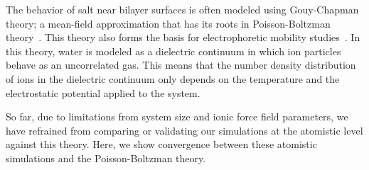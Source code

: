 \documentclass[12pt,openany,final]{book}
\begin{document}
The behavior of salt near bilayer surfaces is often modeled using Gouy-Chapman theory; 
a mean-field approximation that has its roots in Poisson-Boltzman theory~\cite{israelachvili:2011:intermol,wiersema:1966}. 
This theory also forms the basis for electrophoretic mobility studies~\cite{wiersema:1966,o:1978:electrophoretic}. 
In this theory, water is modeled as 
a dielectric continuum in which ion particles behave as an uncorrelated gas. This means that the number density distribution of ions in the dielectric continuum only
depends on the temperature and the electrostatic potential applied to the system.

So far, due to limitations from system size and ionic force field parameters, 
we have refrained from comparing or validating our simulations at the atomistic level against this theory. 
Here, we show convergence between these atomistic simulations and the Poisson-Boltzman theory.  
\end{document}
